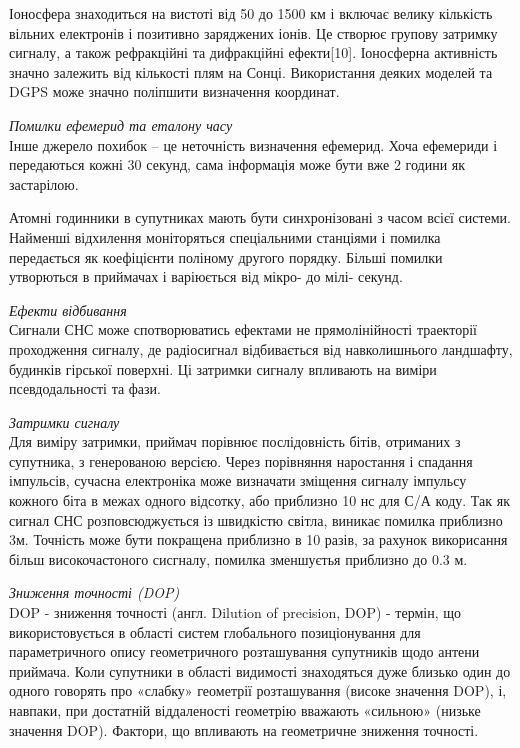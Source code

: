 Іоносфера знаходиться на вистоті від 50 до 1500 км і включає велику кількість  
вільних електронів і позитивно заряджених іонів. Це створює групову затримку 
сигналу, а також рефракційні та дифракційні ефекти[10]. Іоносферна 
активність значно залежить від кількості плям на Сонці. Використання деяких 
моделей та DGPS може значно поліпшити визначення координат.

\vspace{5mm}
\textit{Помилки ефемерид та еталону часу}\\
Інше джерело похибок -- це неточність визначення ефемерид. Хоча 
ефемериди і передаються кожні 30 секунд, сама інформація може бути вже 2 
години як застарілою. 

Атомні годинники в супутниках мають бути синхронізовані з часом 
всієї системи. Найменші відхилення моніторяться спеціальними станціями і 
помилка передається як коефіцієнти поліному другого порядку. Більші помилки 
утворються в приймачах і варіюється від мікро- до мілі- секунд.

\vspace{5mm}
\textit{Ефекти відбивання}\\
Сигнали СНС може спотворюватись ефектами не прямолінійності траекторії проходження  
сигналу, де радіосигнал відбивається від навколишнього ландшафту, будинків 
гірської поверхні. Ці затримки сигналу впливають на виміри псевдодальності та фази. 

\vspace{5mm}
\textit{Затримки сигналу}\\
Для виміру затримки, приймач порівнює послідовність бітів, отриманих з супутника, 
з генерованою версією. Через порівняння наростання і спадання імпульсів, сучасна 
електроніка може визначати зміщення сигналу імпульсу кожного біта в межах одного 
відсотку, або приблизно 10 нс для С/А коду. Так як сигнал СНС розповсюджується із 
швидкістю світла, виникає помилка приблизно 3м.
Точність може бути покращена приблизно в 10 разів, за рахунок викорисання 
більш високочастоного сисгналу, помилка зменшуєтья приблизно до 0.3 м.

\vspace{5mm}
\textit{Зниження точності (DOP)}\\
DOP -  зниження точності (англ. Dilution of precision, DOP)
 - термін, 
що використовується в області систем глобального позиціонування для 
параметричного опису геометричного розташування супутників щодо антени 
приймача. Коли супутники в області видимості знаходяться дуже близько 
один до одного говорять про «слабку» геометрії розташування (високе значення DOP), 
і, навпаки, при достатній віддаленості геометрію вважають «сильною» (низьке значення DOP). 
Фактори, що впливають на геометричне зниження точності.

